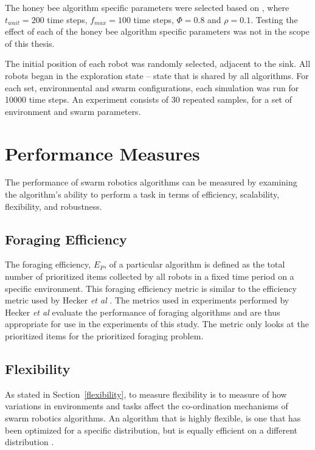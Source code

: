 The honey bee algorithm specific parameters were selected based on \cite{seeley2009wisdom}, where
 $t_{wait}=200$ time steps, $f_{max}=100$ time steps, $\Phi=0.8$ and $\rho=0.1$. Testing the effect of each of the honey bee algorithm specific parameters was not in the scope of this thesis.

The initial position of each robot was randomly selected, adjacent to the sink. All robots began in the exploration state -- state that is shared by all algorithms. For each set, environmental and swarm configurations, each simulation was run for 10000 time steps. An experiment consists of 30 repeated samples, for a set of environment and swarm parameters.

\section{Performance Measures}
\label{thri:third:performancemeasures}

The performance of swarm robotics algorithms can be measured by examining the algorithm's ability to perform a task in terms of efficiency, scalability, flexibility, and robustness.

\subsection{Foraging Efficiency}
\label{setup:foragingefficiency}
The foraging efficiency, $E_P$, of a particular algorithm is defined as the total number of prioritized items collected by all robots in a fixed time period on a specific environment. This foraging efficiency metric is similar to the efficiency metric used by Hecker \textit{et al} \cite{hecker2015beyond}. The metrics used in experiments performed by Hecker \textit{et al} evaluate the performance of foraging algorithms and are thus appropriate for use in the experiments of this study. The metric only looks at the prioritized items for the prioritized foraging problem.

\subsection{Flexibility}
\label{setup:flexibility}
As stated in Section~\ref{flexibility}, to measure flexibility is to measure of how variations in environments and tasks affect the co-ordination mechanisms of swarm robotics algorithms. An algorithm that is highly flexible, is one that has been optimized for a specific distribution, but is equally efficient on a different distribution \cite{hecker2015beyond}.

